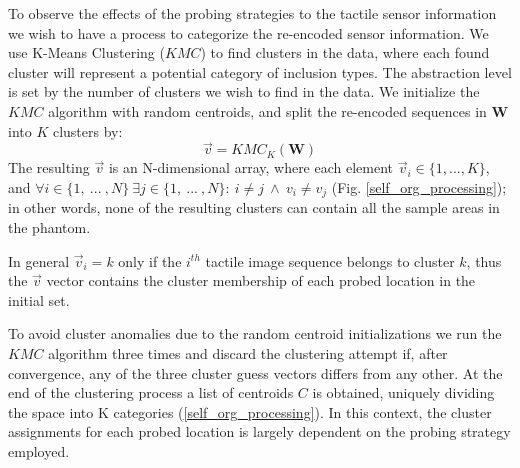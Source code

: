 \documentclass[]{interact}
\theoremstyle{plain}%
\theoremstyle{definition}
\theoremstyle{remark}
\begin{document}
To observe the effects of the probing strategies to the tactile sensor information we wish to have a process to 
categorize the re-encoded sensor information. We use K-Means Clustering ($KMC$) to find clusters in the data, 
where each found cluster will represent a potential category of inclusion types. The abstraction level is set by the
number of clusters we wish to find in the data. 
We initialize the $KMC$ algorithm with random centroids, and split the re-encoded sequences in $\mathbf{W}$ into $K$ 
clusters by:
\begin{equation}
\vec{v} = KMC_{K}(\mathbf{W})
\end{equation}
The resulting $\vec{v}$ is an N-dimensional array, where each element $\vec{v}_i\in\{1, ..., K\}$, 
and $\forall i\in \{1,\ ...\ , N\}\ \exists j\in \{1,\ ...\ , N\}:\ i\neq j\ \land\ v_i\neq v_j$ 
(Fig. \ref{self_org_processing}); in other words, none of the resulting clusters can contain all the sample 
areas in the phantom. 

In general $\vec{v}_i=k$ only if the $i^{th}$ tactile image sequence belongs to cluster $k$, thus the $\vec{v}$ 
vector contains the cluster membership of each probed location in the initial set. 

To avoid cluster anomalies due to the random centroid initializations we run the $KMC$ algorithm three times 
and discard the clustering attempt if, after convergence, any of the three cluster guess vectors differs from 
any other. At the end of the clustering process a list of centroids $C$ is obtained, uniquely dividing the 
space into K categories (\ref{self_org_processing}). In this context, the cluster assignments for each probed 
location is largely dependent on the probing strategy employed. 
\end{document}

